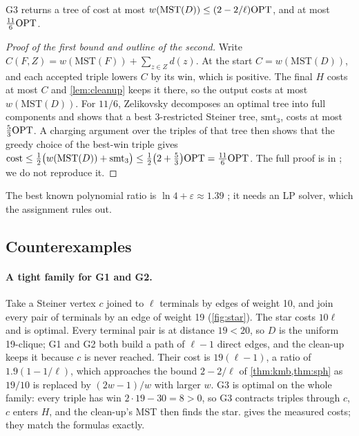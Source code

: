 \begin{theorem}[Zelikovsky 1993]\label{thm:zel}
G3 returns a tree of cost at most \(w(\mathrm{MST}(D))\le(2-2/\ell)\mathrm{OPT}\), and at most \(\tfrac{11}{6}\mathrm{OPT}\).
\end{theorem}
\begin{proof}[Proof of the first bound and outline of the second]
Write \(C(F,Z)=w(\mathrm{MST}(F))+\sum_{z\in Z}d(z)\). At the start \(C=w(\mathrm{MST}(D))\), and each accepted triple lowers \(C\)
by its win, which is positive. The final \(H\) costs at most \(C\) and \cref{lem:cleanup} keeps it there, so the output costs at most
\(w(\mathrm{MST}(D))\). For \(11/6\), Zelikovsky decomposes an optimal tree into full components and shows that a best 3-restricted
Steiner tree, \(\mathrm{smt}_3\), costs at most \(\tfrac53\mathrm{OPT}\). A charging argument over the triples of that tree then shows that
the greedy choice of the best-win triple gives
\(\mathrm{cost}\le\tfrac12\big(w(\mathrm{MST}(D))+\mathrm{smt}_3\big)\le\tfrac12\big(2+\tfrac53\big)\mathrm{OPT}=\tfrac{11}{6}\mathrm{OPT}\).
The full proof is in \cite{zel93}; we do not reproduce it.
\end{proof}
\noindent The best known polynomial ratio is \(\ln4+\varepsilon\approx1.39\) \cite{bgrs}; it needs an LP solver, which the
assignment rules out.

\subsection{Counterexamples}\label{sec:counter}
\paragraph{A tight family for G1 and G2.}
Take a Steiner vertex \(c\) joined to \(\ell\) terminals by edges of weight 10, and join every pair of terminals by an edge of
weight 19 (\cref{fig:star}). The star costs \(10\ell\) and is optimal. Every terminal pair is at distance \(19<20\), so \(D\)
is the uniform 19-clique; G1 and G2 both build a path of \(\ell-1\) direct edges, and the clean-up keeps it because \(c\) is never
reached. Their cost is \(19(\ell-1)\), a ratio of \(1.9(1-1/\ell)\), which approaches the bound \(2-2/\ell\) of
\cref{thm:kmb,thm:sph} as \(19/10\) is replaced by \((2w-1)/w\) with larger \(w\). G3 is optimal on the whole family: every triple has
win \(2\cdot19-30=8>0\), so G3 contracts triples through \(c\), \(c\) enters \(H\), and the clean-up's MST then finds the star.
 gives the measured costs; they match the formulas exactly.

